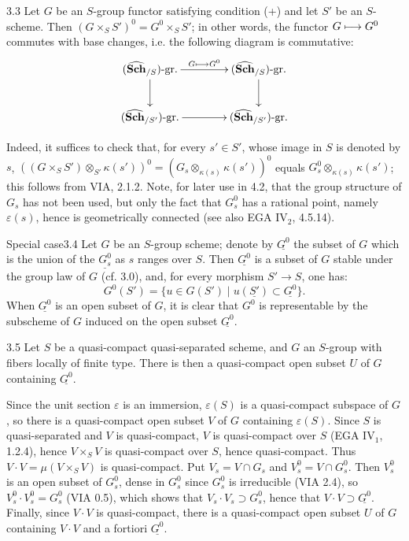 \begin{proposition}{3.3}\label{VIB.3.3}
Let $G$ be an $S$-group functor satisfying condition (+) and let $S'$ be an $S$-scheme. Then $(G\times_SS')^0=G^0\times_SS'$; in other words, the functor $G\longmapsto G^0$ commutes with base changes, i.e. the following diagram is commutative:
\[
\xymatrix@C=4em{(\widehat{\mathbf{Sch}}_{/S})\text{-gr.}\ar[r]^{G\mto G^0}\ar[d]&(\widehat{\mathbf{Sch}}_{/S})\text{-gr.}\ar[d]\\(\widehat{\mathbf{Sch}}_{/S'})\text{-gr.}\ar[r]&(\widehat{\mathbf{Sch}}_{/S'})\text{-gr.}}
\]
\end{proposition}
Indeed, it suffices to check that, for every $s'\in S'$, whose image in $S$ is denoted by $s$, $((G\times_SS')\otimes_{S'}\kappa(s'))^0=(G_s\otimes_{\kappa(s)}\kappa(s'))^0$ equals $G_s^0\otimes_{\kappa(s)}\kappa(s')$; this follows from VIA, 2.1.2. Note, for later use in 4.2, that the group structure of $G_s$ has not been used, but only the fact that $G_s^0$ has a rational point, namely $\varepsilon(s)$, hence is geometrically connected (see also EGA IV$_2$, 4.5.14).
\begin{enoncerm}{Special case}{3.4}\label{VIB.3.4}
Let $G$ be an $S$-group scheme; denote by $\underline{G^0}$ the subset of $G$ which is the union of the $\underline{G_s^0}$ as $s$ ranges over $S$. Then $\underline{G^0}$ is a subset of $G$ stable under the group law of $G$ (cf. 3.0), and, for every morphism $S'\to S$, one has:
\[
G^0(S')=\{u\in G(S')\mid u(\underline{S'})\subset\underline{G^0}\}.
\]
When $\underline{G^0}$ is an open subset of $G$, it is clear that $G^0$ is representable by the subscheme of $G$ induced on the open subset $\underline{G^0}$.
\end{enoncerm}
\begin{proposition}{3.5}\label{VIB.3.5}
Let $S$ be a quasi-compact quasi-separated scheme, and $G$ an $S$-group with fibers locally of finite type. There is then a quasi-compact open subset $U$ of $G$ containing $\underline{G^0}$.
\end{proposition}
Since the unit section $\varepsilon$ is an immersion, $\varepsilon(S)$ is a quasi-compact subspace of $G$, so there is a quasi-compact open subset $V$ of $G$ containing $\varepsilon(S)$. Since $S$ is quasi-separated and $V$ is quasi-compact, $V$ is quasi-compact over $S$ (EGA IV$_1$, 1.2.4), hence $V\times_SV$ is quasi-compact over $S$, hence quasi-compact. Thus $V\cdot V=\mu(V\times_SV)$ is quasi-compact. Put $V_s=V\cap G_s$ and $V_s^0=V\cap G_s^0$. Then $V_s^0$ is an open subset of $G_s^0$, dense in $G_s^0$ since $G_s^0$ is irreducible (VIA 2.4), so $V_s^0\cdot V_s^0=G_s^0$ (VIA 0.5), which shows that $V_s\cdot V_s\supset G_s^0$, hence that $V\cdot V\supset\underline{G^0}$. Finally, since $V\cdot V$ is quasi-compact, there is a quasi-compact open subset $U$ of $G$ containing $V\cdot V$ and a fortiori $\underline{G^0}$.
